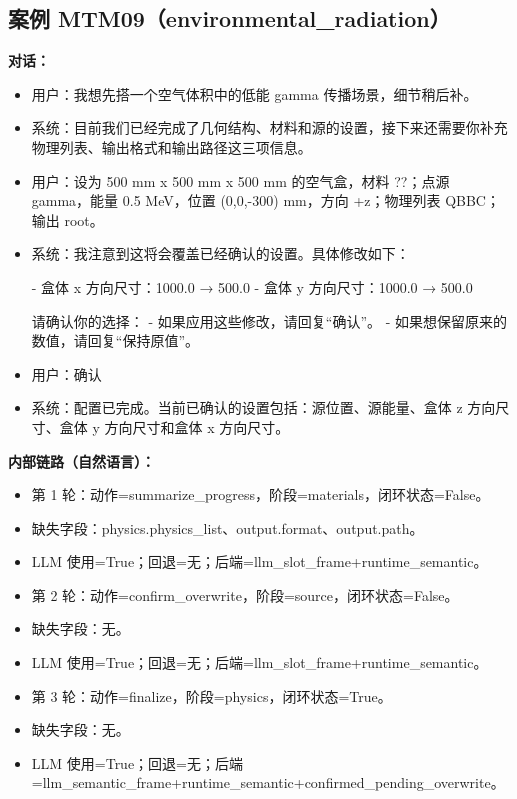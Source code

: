 \documentclass[11pt]{ctexart}
\begin{document}
\subsection{案例 MTM09（environmental\_radiation）}
\textbf{对话：}
\begin{itemize}
\item 用户：我想先搭一个空气体积中的低能 gamma 传播场景，细节稍后补。
\item 系统：目前我们已经完成了几何结构、材料和源的设置，接下来还需要你补充物理列表、输出格式和输出路径这三项信息。
\item 用户：设为 500 mm x 500 mm x 500 mm 的空气盒，材料 ??；点源 gamma，能量 0.5 MeV，位置 (0,0,-300) mm，方向 +z；物理列表 QBBC；输出 root。
\item 系统：我注意到这将会覆盖已经确认的设置。具体修改如下：

- 盒体 x 方向尺寸：1000.0 → 500.0
- 盒体 y 方向尺寸：1000.0 → 500.0

请确认你的选择：
- 如果应用这些修改，请回复“确认”。
- 如果想保留原来的数值，请回复“保持原值”。
\item 用户：确认
\item 系统：配置已完成。当前已确认的设置包括：源位置、源能量、盒体 z 方向尺寸、盒体 y 方向尺寸和盒体 x 方向尺寸。
\end{itemize}
\textbf{内部链路（自然语言）：}
\begin{itemize}
\item 第 1 轮：动作=summarize\_progress，阶段=materials，闭环状态=False。
\item 缺失字段：physics.physics\_list、output.format、output.path。
\item LLM 使用=True；回退=无；后端=llm\_slot\_frame+runtime\_semantic。
\item 第 2 轮：动作=confirm\_overwrite，阶段=source，闭环状态=False。
\item 缺失字段：无。
\item LLM 使用=True；回退=无；后端=llm\_slot\_frame+runtime\_semantic。
\item 第 3 轮：动作=finalize，阶段=physics，闭环状态=True。
\item 缺失字段：无。
\item LLM 使用=True；回退=无；后端=llm\_semantic\_frame+runtime\_semantic+confirmed\_pending\_overwrite。
\end{itemize}
\end{document}
